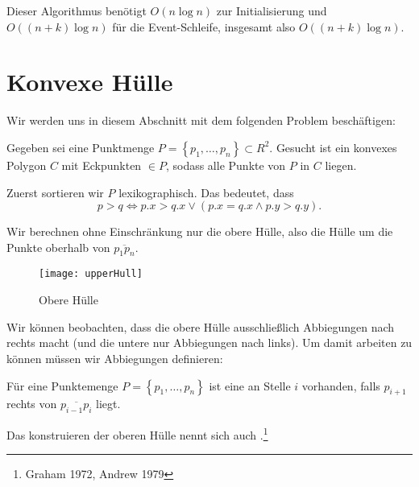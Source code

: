 Dieser Algorithmus benötigt \( O(n\log n) \) zur Initialisierung und \( O((n+k)\log n) \) für die Event-Schleife, insgesamt also \( O((n+k)\log n) \).

\section{Konvexe Hülle}

Wir werden uns in diesem Abschnitt mit dem folgenden Problem beschäftigen:

Gegeben sei eine Punktmenge \( P = \left \{ p_1, \dots, p_n \right \} \subset R^2 \). Gesucht ist ein konvexes Polygon \( C \) mit Eckpunkten \( \in P \), sodass alle Punkte von \( P \) in \( C \) liegen.

Zuerst sortieren wir \( P \) lexikographisch. Das bedeutet, dass
\begin{equation*}
  p > q \Leftrightarrow p\text{.}x > q\text{.}x \vee \left( p\text{.}x = q\text{.}x \wedge p\text{.}y > q\text{.}y \right)\text{.}
\end{equation*}

\begin{minipage}{.475\textwidth}
  \vspace*{1em}
  Wir berechnen ohne Einschränkung nur die obere Hülle, also die Hülle um die Punkte oberhalb von \( \overline{p_1 p_n} \).
  \vspace*{1em}
\end{minipage}
\hfill
\begin{minipage}{.475\textwidth}
  \vspace*{1em}
  \begin{figure}[H]
    \texttt{[image: upperHull]}
    \caption{Obere Hülle}
  \end{figure}
  \vspace*{1em}
\end{minipage}

Wir können beobachten, dass die obere Hülle ausschließlich Abbiegungen nach rechts macht (und die untere nur Abbiegungen nach links). Um damit arbeiten zu können müssen wir Abbiegungen definieren:

\begin{definition}[Abbiegung]
  Für eine Punktemenge \( P = \left \{ p_1, \dots, p_n \right \} \) ist eine  an Stelle \( i \) vorhanden, falls \( p_{i+1} \) rechts von \( \overline{p_{i-1}p_i} \) liegt.
\end{definition}

Das konstruieren der oberen Hülle nennt sich auch .\footnote{Graham 1972, Andrew 1979}

